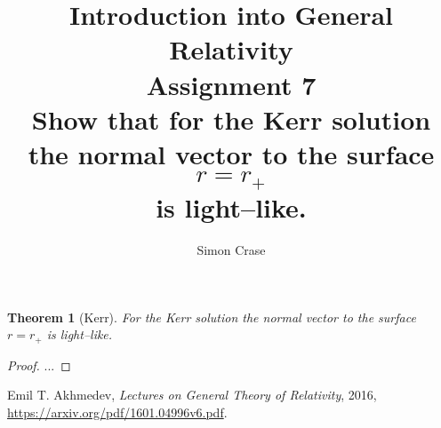 \documentclass[]{article}
\title{Introduction into General Relativity\\Assignment 7\\Show that for the Kerr solution\\the normal vector to the surface $r=r_+$\\is light--like.}
\author{Simon Crase}
\newtheorem{theorem}{Theorem}
\begin{document}
\maketitle

\begin{theorem}[Kerr]
	For the Kerr solution the normal vector to the surface $r=r_+$ is light--like.
\end{theorem}

\begin{proof}
	...
\end{proof}


\begin{thebibliography}{9}
	
	Emil T. Akhmedev,
	\emph{Lectures on General Theory of Relativity},
	2016,
	\url{https://arxiv.org/pdf/1601.04996v6.pdf}.
	
\end{thebibliography}
\end{document}
